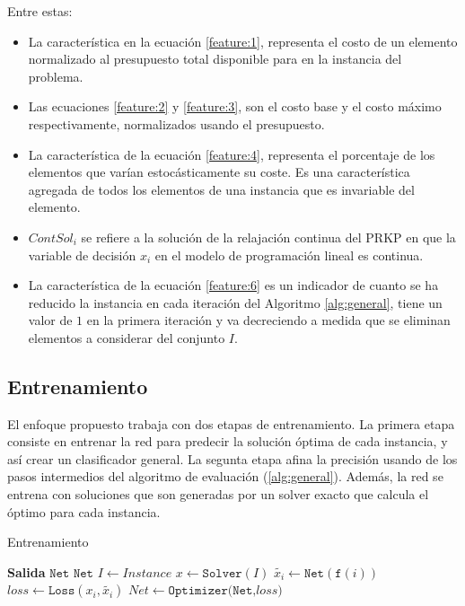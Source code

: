 \documentclass[spanish, a4paper, 12pt, openany,final]{book}
\begin{document}
Entre estas:
\begin{itemize}
	\item La característica en la ecuación \eqref{feature:1}, representa el costo de un elemento normalizado al presupuesto total disponible para en la instancia del problema.
	\item Las ecuaciones \eqref{feature:2} y \eqref{feature:3}, son el costo base y el costo máximo respectivamente, normalizados usando el presupuesto.
	\item La característica de la ecuación \eqref{feature:4}, representa el porcentaje de los elementos que varían estocásticamente su coste. Es una característica agregada de todos los elementos de una instancia que es invariable del elemento.
	
	\item $ContSol_i$ se refiere a la solución de la relajación continua del PRKP en que la variable de decisión $x_i$ en el modelo de programación lineal es continua.
	
	\item La característica de la ecuación \eqref{feature:6} es un indicador de cuanto se ha reducido la instancia en cada iteración del Algoritmo \ref{alg:general}, tiene un valor de $1$ en la primera iteración y va decreciendo a medida que se eliminan elementos a considerar del conjunto $I$.
	
\end{itemize}


\subsection{Entrenamiento}

El enfoque propuesto trabaja con dos etapas de entrenamiento. La primera etapa consiste en entrenar la red para predecir la solución óptima de cada instancia, y así crear un clasificador general. La segunta etapa afina la precisión usando de los pasos intermedios del algoritmo de evaluación (\ref{alg:general}). Además, la red se entrena con soluciones que son generadas por un solver exacto que calcula el óptimo para cada instancia. 

\begin{algorithm}[H]
	\caption{Entrenamiento}\label{alg:training}
	\begin{algorithmic}[1]
		\Statex \textbf{Salida} $\texttt{Net}$
		\label{line:loss}
		\State $\texttt{Net}$ \label{line:def_net}
		   \label{line:startloop}
		\State $I \gets Instance$ \label{line:i_from_instance}
		\State $x \gets \texttt{Solver}(I)$\label{line:solveinstance}
		 \label{line:startinnerloop}
		\State $\tilde{x_i} \gets \texttt{Net}(\texttt{f}(i))$   \label{line:prediction}
		\State $loss \gets \texttt{Loss}(x_i,\tilde{x_i})$ \label{line:calculateloss}
		\State $Net \gets \texttt{Optimizer(Net,$loss$)}$ \label{line:optimizationstep}
		\EndFor \label{line:endinnerloop}
		\EndFor \label{line:endloop}
	\end{algorithmic}
\end{algorithm}
\end{document}
